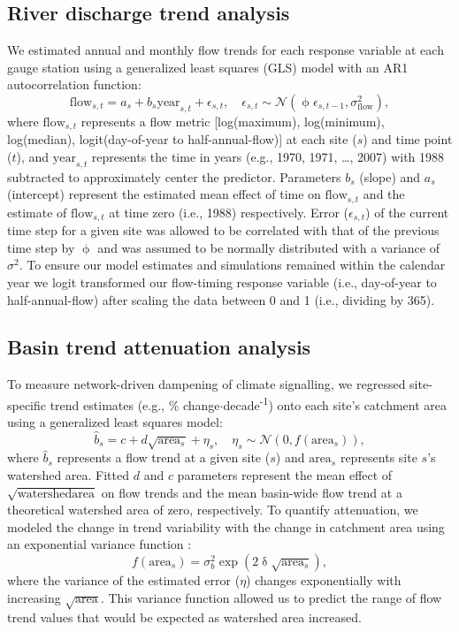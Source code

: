 \documentclass[9pt,twocolumn,twoside,lineno]{pnas-new}
\begin{document}
{\subsection*{River discharge trend analysis} We estimated annual and monthly flow trends for each response variable at each gauge station using a generalized least squares (GLS) model with an AR1 autocorrelation function:
\begin{equation}
  \mathrm{flow}_{s,t} = a_s + b_s \mathrm{year}_{s,t} + \epsilon_{s,t}, \quad 
  \epsilon_{s,t} \sim \mathcal{N}(\upphi \epsilon_{s,t-1}, \sigma_\mathrm{flow}^2) \label{eq1},
\end{equation}
where $\mathrm{flow}_{s,t}$ represents a flow metric [log(maximum), log(minimum), log(median), logit(day-of-year to half-annual-flow)] at each site ($s$) and time point ($t$),  and $\mathrm{year}_{s,t}$ represents the time in years (e.g., 1970, 1971, \ldots, 2007) with 1988 subtracted to approximately center the predictor. Parameters $b_{s}$ (slope) and $a_{s}$ (intercept) represent the estimated mean effect of time on $\mathrm{flow}_{s,t}$ and the estimate of $\mathrm{flow}_{s,t}$ at time zero (i.e., 1988) respectively. Error ($\epsilon_{s,t}$) of the current time step for a given site was allowed to be correlated with that of the previous time step by $\upphi$ and was assumed to be normally distributed with a variance of $\sigma^{2}$. To ensure our model estimates and simulations remained within the calendar year we logit transformed our flow-timing response variable (i.e., day-of-year to half-annual-flow) after scaling the data between 0 and 1 (i.e., dividing by 365).

\subsection*{Basin trend attenuation analysis} To measure network-driven dampening of climate signalling, we regressed site-specific trend estimates (e.g., \% change$\cdot$decade\textsuperscript{-1}) onto each site's catchment area using a generalized least squares model:
\begin{equation}
	\hat{b}_{s} = c + d\sqrt{\mathrm{area}_{s}} + \eta_{s}, \quad
  \eta_{s} \sim \mathcal{N}(0, f(\mathrm{area}_{s})) \label{eq2},
\end{equation}
where $\hat{b}_{s}$ represents a flow trend at a given site ($s$) and $\mathrm{area}_{s}$ represents site $s$'s watershed area. Fitted $d$ and $c$ parameters represent the mean effect of $\sqrt{\mathrm{watershed area}}$ on flow trends and the mean basin-wide flow trend at a theoretical watershed area of zero, respectively. To quantify attenuation, we modeled the change in trend variability with the change in catchment area using an exponential variance function \cite[p.~211]{Pinheiro:2000}: 
\begin{equation}
	f(\mathrm{area}_{s}) = \sigma_b^2 \exp(2\updelta\sqrt{\mathrm{area}_{s}}) \label{eq3},
\end{equation}
where the variance of the estimated error ($\eta$) changes exponentially with increasing $\sqrt{\mathrm{area}}$. This variance function allowed us to predict the range of flow trend values that would be expected as watershed area increased. 

}
\end{document}
